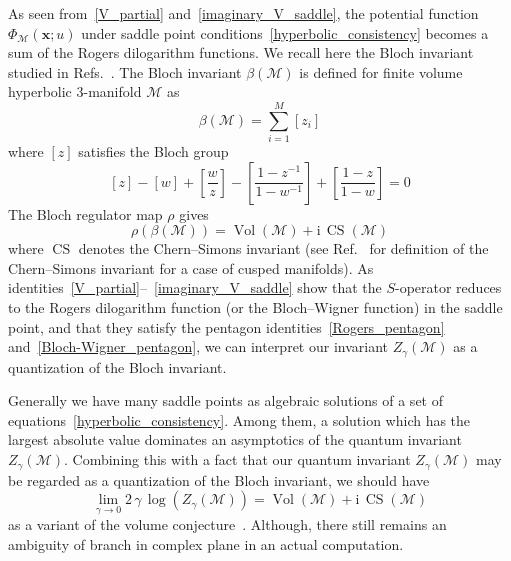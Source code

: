 \documentclass[12pt,reqno]{amsart}
\numberwithin{equation}{section}
\DeclareMathOperator{\CS}{CS}
\DeclareMathOperator{\Vol}{Vol}
\newcommand{\I}{\mathrm{i}}
\begin{document}
As seen from~\eqref{V_partial} and~\eqref{imaginary_V_saddle}, the
potential function $\Phi_{\mathcal{M}}(\boldsymbol{x};u)$
under  saddle point conditions~\eqref{hyperbolic_consistency} becomes
a sum of the Rogers
dilogarithm functions.
We recall here the Bloch invariant 
studied in 
Refs.~.
The Bloch invariant $\beta(\mathcal{M})$ is defined for
finite volume
hyperbolic 3-manifold $\mathcal{M}$ as
\begin{equation}
  \beta(\mathcal{M}) = \sum_{i=1}^M \left[ z_i \right]
\end{equation}
where $\left[ z \right]$ satisfies  the Bloch group
\begin{equation}
  \left[ z \right] -  \left[w \right]
  +
  \left[\frac{w}{z} \right]
  - \left[ \frac{1-z^{-1}}{1- w^{-1}} \right]
  + \left[ \frac{1-z}{1-w} \right]
  =
  0
\end{equation}
The Bloch regulator map $\rho$ gives~\cite{NeumYang99a}
\begin{equation}
  \rho\left( \beta(\mathcal{M}) \right)
  =
  \Vol(\mathcal{M})
  + \I \, \CS(\mathcal{M})
\end{equation}
where $\CS$ denotes the Chern--Simons invariant
(see Ref.~ for definition of the Chern--Simons invariant for a
case of cusped manifolds).
As identities~\eqref{V_partial}--~\eqref{imaginary_V_saddle} show that
the $S$-operator reduces to the Rogers dilogarithm function
(or the Bloch--Wigner function) in the saddle
point, and that they satisfy the pentagon
identities~\eqref{Rogers_pentagon} and~\eqref{Bloch-Wigner_pentagon},
we can interpret our invariant $Z_\gamma(\mathcal{M})$ as a
quantization of the Bloch invariant.


Generally we have many saddle points as algebraic solutions of a set of
equations~\eqref{hyperbolic_consistency}.
Among them, a solution which has the  largest absolute value
dominates an asymptotics of the quantum invariant $Z_\gamma(\mathcal{M})$.
Combining this with a fact that
our quantum invariant $Z_\gamma(\mathcal{M})$ may be regarded as a
quantization of the Bloch invariant,
we should have
\begin{equation}
  \lim_{\gamma \to 0}
  2 \, \gamma\,
  \log \left(
    Z_\gamma(\mathcal{M})
  \right)
  =
  \Vol(\mathcal{M})
  + \I \,
  \CS(\mathcal{M})
\end{equation}
as a variant of the volume conjecture~\cite{Hikam00d}.
Although, there still remains an ambiguity of branch in complex plane
in an actual computation.
\end{document}
